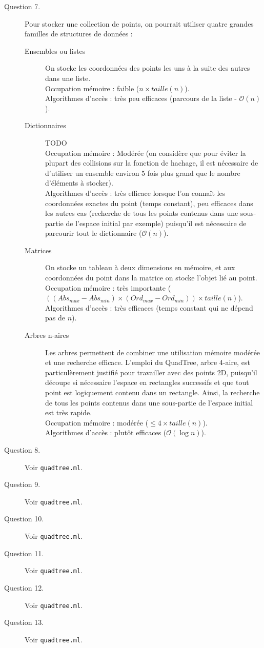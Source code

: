 \documentclass[11pt]{scrartcl}
\newcommand{\filename}[1]{\texttt{\textcolor{RawSienna}{#1}}}
\begin{document}
\begin{description}
\item[Question 7.] Pour stocker une collection de points, on pourrait utiliser quatre grandes familles de structures de données :
\begin{description}
\item[Ensembles ou listes] On stocke les coordonnées des points les uns à la suite des autres dans une liste.\\
Occupation mémoire : faible ($n \times taille(n)$).\\
Algorithmes d'accès : très peu efficaces (parcours de la liste - $\mathcal{O}(n)$).
\item[Dictionnaires] TODO\\
Occupation mémoire : Modérée (on considère que pour éviter la plupart des collisions sur la fonction de hachage, il est nécessaire de d'utiliser un ensemble environ 5 fois plus grand que le nombre d'éléments à stocker).\\
Algorithmes d'accès : très efficace lorsque l'on connaît les coordonnées exactes du point (temps constant), peu efficaces dans les autres cas (recherche de tous les points contenus dans une sous-partie de l'espace initial par exemple) puisqu'il est nécessaire de parcourir tout le dictionnaire ($\mathcal{O}(n)$).
\item[Matrices] On stocke un tableau à deux dimensions en mémoire, et aux coordonnées du point dans la matrice on stocke l'objet lié au point.\\
Occupation mémoire : très importante ($((Abs_{max} - Abs_{min}) \times (Ord_{max} - Ord_{min})) \times taille(n)$).\\
Algorithmes d'accès : très efficaces (temps constant qui ne dépend pas de $n$).
\item[Arbres n-aires] Les arbres permettent de combiner une utilisation mémoire modérée et une recherche efficace. L'emploi du QuadTree, arbre 4-aire, est particulèrement justifié pour travailler avec des points 2D, puisqu'il découpe si nécessaire l'espace en rectangles successifs et que tout point est logiquement contenu dans un rectangle. Ainsi, la recherche de tous les points contenus dans une sous-partie de l'espace initial est très rapide.\\
Occupation mémoire : modérée ($\leq 4 \times taille(n)$).\\
Algorithmes d'accès : plutôt efficaces ($\mathcal{O}(\log{}n)$).
\end{description}
\item[Question 8.] Voir \filename{quadtree.ml}.
\item[Question 9.] Voir \filename{quadtree.ml}.
\item[Question 10.] Voir \filename{quadtree.ml}.
\item[Question 11.] Voir \filename{quadtree.ml}.
\item[Question 12.] Voir \filename{quadtree.ml}.
\item[Question 13.] Voir \filename{quadtree.ml}.
\end{description}
\end{document}
